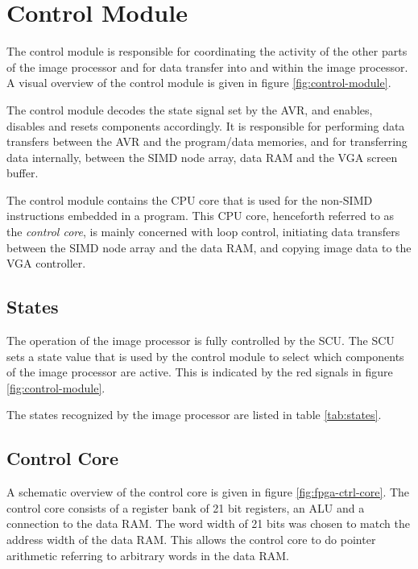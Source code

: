 \section{Control Module}

The control module is responsible for coordinating the activity of the
other parts of the image processor and for data transfer into and within
the image processor. A visual overview of the control module is given in
figure \ref{fig:control-module}.



The control module decodes the state signal set by the AVR, and enables,
disables and resets components accordingly. It is responsible for
performing data transfers between the AVR and the program/data memories,
and for transferring data internally, between the SIMD node array, data
RAM and the VGA screen buffer.

The control module contains the CPU core that is used for the non-SIMD
instructions embedded in a program. This CPU core, henceforth referred
to as the \emph{control core}, is mainly concerned with loop control,
initiating data transfers between the SIMD node array and the data RAM,
and copying image data to the VGA controller.

\subsection{States}

The operation of the image processor is fully controlled by the SCU. The
SCU sets a state value that is used by the control module to select
which components of the image processor are active. This is indicated by
the red signals in figure \ref{fig:control-module}.

The states recognized by the image processor are listed in table
\ref{tab:states}.



\subsection{Control Core}

A schematic overview of the control core is given in figure
\ref{fig:fpga-ctrl-core}. The control core consists of a register bank
of 21 bit registers, an ALU and a connection to the data RAM. The word
width of 21 bits was chosen to match the address width of the data RAM.
This allows the control core to do pointer arithmetic referring to
arbitrary words in the data RAM.

